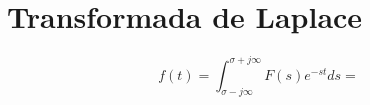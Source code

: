 \documentclass[a4paper, 12pt]{article}
\begin{document}

\section{Transformada de Laplace}

\[f(t) = \int_{\sigma-j\infty}^{\sigma+j\infty} F(s) e^{-st}ds = \]
\end{document}
